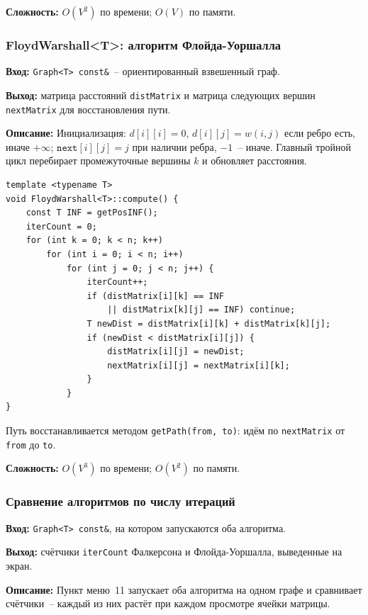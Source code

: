 \textbf{Сложность:} $O(V^2)$ по времени; $O(V)$ по памяти.

\subsubsection{FloydWarshall\textless T\textgreater: алгоритм Флойда-Уоршалла}

\textbf{Вход:} \texttt{Graph<T> const\&}~-- ориентированный взвешенный граф.

\textbf{Выход:} матрица расстояний \texttt{distMatrix} и матрица
следующих вершин \texttt{nextMatrix} для восстановления пути.

\textbf{Описание:} Инициализация: $d[i][i] = 0$, $d[i][j] = w(i,j)$
если ребро есть, иначе $+\infty$; $\texttt{next}[i][j] = j$ при наличии
ребра, $-1$~-- иначе. Главный тройной цикл перебирает промежуточные
вершины $k$ и обновляет расстояния.

\begin{lstlisting}[style=cstyle, caption={Основной цикл Флойда-Уоршалла (warshall.cpp)}]
template <typename T>
void FloydWarshall<T>::compute() {
    const T INF = getPosINF();
    iterCount = 0;
    for (int k = 0; k < n; k++)
        for (int i = 0; i < n; i++)
            for (int j = 0; j < n; j++) {
                iterCount++;
                if (distMatrix[i][k] == INF
                    || distMatrix[k][j] == INF) continue;
                T newDist = distMatrix[i][k] + distMatrix[k][j];
                if (newDist < distMatrix[i][j]) {
                    distMatrix[i][j] = newDist;
                    nextMatrix[i][j] = nextMatrix[i][k];
                }
            }
}
\end{lstlisting}

Путь восстанавливается методом \texttt{getPath(from, to)}: идём по
\texttt{nextMatrix} от \texttt{from} до \texttt{to}.

\textbf{Сложность:} $O(V^3)$ по времени; $O(V^2)$ по памяти.

\subsubsection{Сравнение алгоритмов по числу итераций}

\textbf{Вход:}  \texttt{Graph<T> const\&}, на котором запускаются оба алгоритма.

\textbf{Выход:} счётчики \texttt{iterCount} Фалкерсона и Флойда-Уоршалла,
выведенные на экран.

\textbf{Описание:} Пункт меню~11 запускает оба алгоритма на одном графе
и сравнивает счётчики~-- каждый из них растёт при каждом просмотре
ячейки матрицы.
